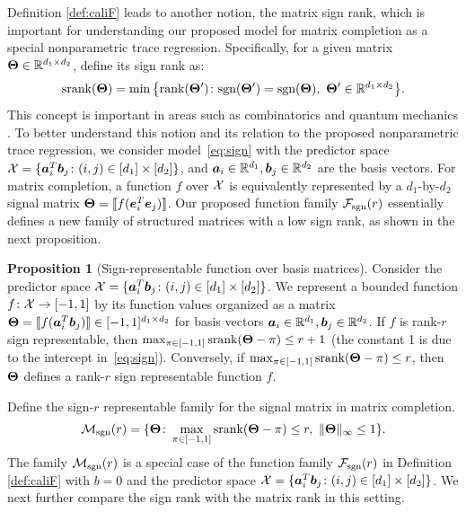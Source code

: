\documentclass[aos]{imsart}
\theoremstyle{definition}
\newtheorem{proposition}{Proposition}
\def\sign{\textup{sgn}}
\def\srank{\textup{srank}}
\def\rank{\textup{rank}}
\def\caliF{\tF_{\textup{sgn}}}
\def\caliM{\tM_{\textup{sgn}}}
\begin{document}
Definition \ref{def:caliF} leads to another notion, the matrix sign rank, which is important for understanding our proposed model for matrix completion as a special nonparametric trace regression. Specifically, for a given matrix $\bm{\Theta}\in\mathbb{R}^{d_1\times d_2}$, define its sign rank as: 
\begin{equation*}
\srank(\mTheta)=\min\big\{ \rank(\mTheta')\colon \sign(\mTheta')=\sign(\mTheta),\  \mTheta'\in\mathbb{R}^{d_1\times d_2} \big\}.
\end{equation*}
This concept is important in areas such as combinatorics \citep{cohn2013fast} and quantum mechanics \citep{de2003nondeterministic}. To better understand this notion and its relation to the proposed nonparametric trace regression, we consider model~\eqref{eq:sign} with the predictor space $\mathcal{X} = \{\bm{a}^T_i\bm{b}_j\colon (i,j)\in[d_1]\times[d_2]\}$, and $\bm{a}_i\in\mathbb{R}^{d_1}, \bm{b}_j\in\mathbb{R}^{d_2}$ are the basis vectors. For matrix completion, a function $f$ over $\mathcal{X}$ is equivalently represented by a $d_1$-by-$d_2$ signal matrix $\bm{\Theta}=\llbracket f(\bm{e}^T_i\bm{e}_j) \rrbracket$. Our proposed function family $\caliF(r)$ essentially defines a new family of structured matrices with a low sign rank, as shown in the next proposition. 

\begin{proposition}[Sign-representable function over basis matrices]\label{prop:signbasis} Consider the predictor space $\mathcal{X}=\{\bm{a}^T_i\bm{b}_j \colon (i,j)\in[d_1]\times[d_2]\}$. We represent a bounded function $f\colon \mathcal{X}\to [-1,1]$ by its function values organized as a matrix $\bm{\Theta}=\llbracket f(\bm{a}^T_i\bm{b}_j) \rrbracket \in [-1,1]^{d_1\times d_2}$ for basis vectors $\bm{a}_i\in\mathbb{R}^{d_1}, \bm{b}_j\in\mathbb{R}^{d_2}$. If $f$ is rank-$r$ sign representable, then $\max_{\pi\in[-1,1]}\srank(\mTheta-\pi)\leq r+1$ (the constant 1 is due to the intercept in~\eqref{eq:sign}). Conversely, if $\max_{\pi\in[-1,1]}\srank(\mTheta-\pi)\leq r$, then $\bm{\Theta}$ defines a rank-$r$ sign representable function $f$. 
\end{proposition}

Define the sign-$r$ representable family for the signal matrix in matrix completion.  
\begin{align*}
\caliM(r)=\{\mTheta\colon \max_{\pi\in[-1,1]}\srank(\mTheta-\pi)\leq r, \ \mnormSize{}{\mTheta}\leq 1\}.
\end{align*}
The family $\caliM(r)$ is a special case of the function family $\caliF(r)$ in Definition \ref{def:caliF} with $b=0$ and the predictor space $\mathcal{X}=\{\bm{a}_i^T\bm{b}_j\colon (i,j)\in[d_1]\times[d_2]\}$. We next further compare the sign rank with the matrix rank in this setting. 
\end{document}
